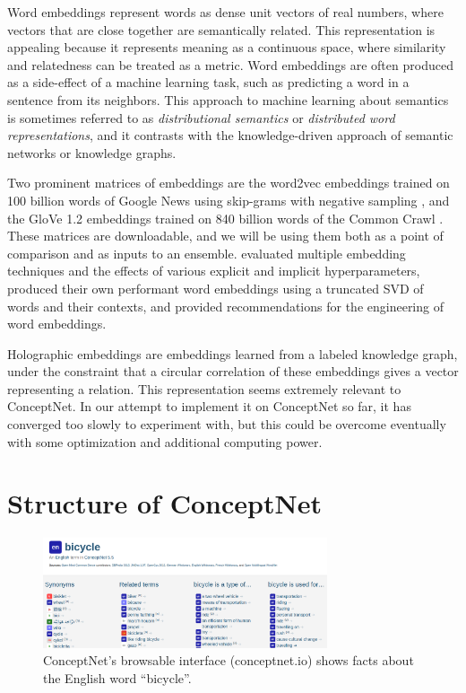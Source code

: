 \documentclass[letterpaper]{article}
\begin{document}
Word embeddings represent words as dense unit vectors of real numbers, where
vectors that are close together are semantically related. This representation
is appealing because it represents meaning as a continuous space, where
similarity and relatedness can be treated as a metric. Word embeddings are
often produced as a side-effect of a machine learning task, such as predicting
a word in a sentence from its neighbors.  This approach to machine learning
about semantics is sometimes referred to as \emph{distributional semantics} or
\emph{distributed word representations}, and it contrasts with the
knowledge-driven approach of semantic networks or knowledge graphs.

Two prominent matrices of embeddings are the word2vec embeddings trained on 100
billion words of Google News using skip-grams with negative sampling
\cite{mikolov2013word2vec}, and the GloVe 1.2 embeddings trained on 840 billion
words of the Common Crawl \cite{pennington2014glove}. These matrices are
downloadable, and we will be using them both as a point of comparison and as
inputs to an ensemble. \citeauthor{levy2015embeddings}
 evaluated multiple embedding techniques and the
effects of various explicit and implicit hyperparameters, produced their own
performant word embeddings using a truncated SVD of words and their contexts,
and provided recommendations for the engineering of word embeddings.

Holographic embeddings \cite{nickel2015holographic} are embeddings learned from
a labeled knowledge graph, under the constraint that a circular correlation of
these embeddings gives a vector representing a relation. This representation
seems extremely relevant to ConceptNet. In our attempt to implement it on
ConceptNet so far, it has converged too slowly to experiment with, but this
could be overcome eventually with some optimization and additional computing
power.

\section{Structure of ConceptNet}\label{structure-of-conceptnet}

\begin{figure}[t]
\centering
\includegraphics[width=3.3in]{cn5-screenshot.png}
\caption{
    ConceptNet's browsable interface (conceptnet.io) shows
    facts about the English word ``bicycle''.
}
\label{screenshot}
\end{figure}
\end{document}
